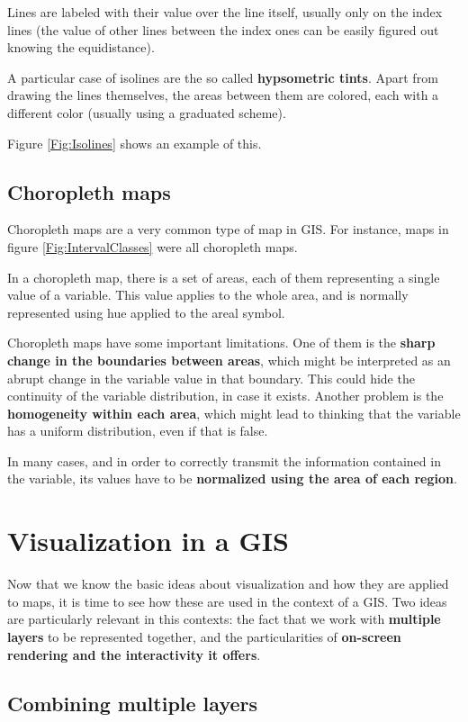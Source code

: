 Lines are labeled with their value over the line itself, usually only on the index lines (the value of other lines between the index ones can be easily figured out knowing the equidistance).

A particular case of isolines are the so called \textbf{hypsometric tints}. Apart from drawing the lines themselves, the areas between them are colored, each with a different color (usually using a graduated scheme).

Figure \ref{Fig:Isolines} shows an example of this.

\subsection{Choropleth maps}

Choropleth maps are a very common type of map in GIS. For instance, maps in figure \ref{Fig:IntervalClasses} were all choropleth maps.

In a choropleth map, there is a set of areas, each of them representing a single value of a variable. This value applies to the whole area, and is normally represented using hue applied to the areal symbol.

Choropleth maps have some  important limitations. One of them is the \textbf{sharp change in the boundaries between areas}, which might be interpreted as an abrupt change in the variable value in that boundary. This could hide the continuity of the variable distribution, in case it exists. Another problem is the \textbf{homogeneity within each area}, which might lead to thinking that the variable has a uniform distribution, even if that is false.

In many cases, and in order to correctly transmit the information contained in the variable, its values have to be \textbf{normalized using the area of each region}.


\section{Visualization in a GIS}

Now that we know the basic ideas about visualization and how they are applied to maps, it is time to see how these are used in the context of a GIS. Two ideas are particularly relevant in this contexts: the fact that we work with \textbf{multiple layers} to be represented together, and the particularities of \textbf{on-screen rendering and the interactivity it offers}.

\subsection{Combining multiple layers}

